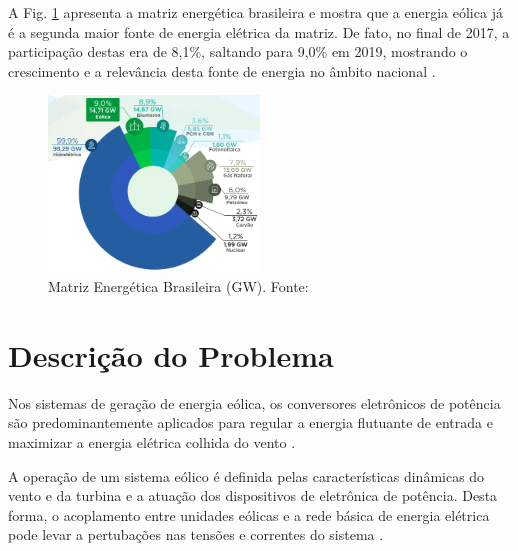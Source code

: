 A Fig. \ref{fig:matriz-energetica-brasileira} apresenta a matriz energética brasileira e mostra que a energia eólica já é a segunda maior fonte de energia elétrica da matriz. 
De fato, no final de 2017, a participação destas era de 8,1\%, saltando para 9,0\% em 2019, mostrando o crescimento e a relevância desta fonte de energia no âmbito nacional \cite{ABEeolica}.


\begin{figure}[!hbt]
	\begin{center}
    \includegraphics[width=0.5\textwidth]{figuras/matriz_eletrica_brasileira.png}
    \caption{Matriz Energética Brasileira (GW). Fonte: \cite{ABEeolica}}
    \label{fig:matriz-energetica-brasileira}
    \end{center}
\end{figure}

\section{Descrição do Problema}


Nos sistemas de geração de energia eólica, os conversores eletrônicos de potência são predominantemente 
aplicados para regular a energia flutuante de entrada e maximizar a energia elétrica colhida do 
vento \cite{Ellabban2014}.

A operação de um sistema eólico é definida pelas características dinâmicas do vento e da turbina e a 
atuação dos dispositivos de eletrônica de potência.
Desta forma, o acoplamento entre unidades eólicas e a rede básica de energia elétrica pode levar a 
pertubações nas tensões e correntes do sistema \cite{TeseProfAlex}.

